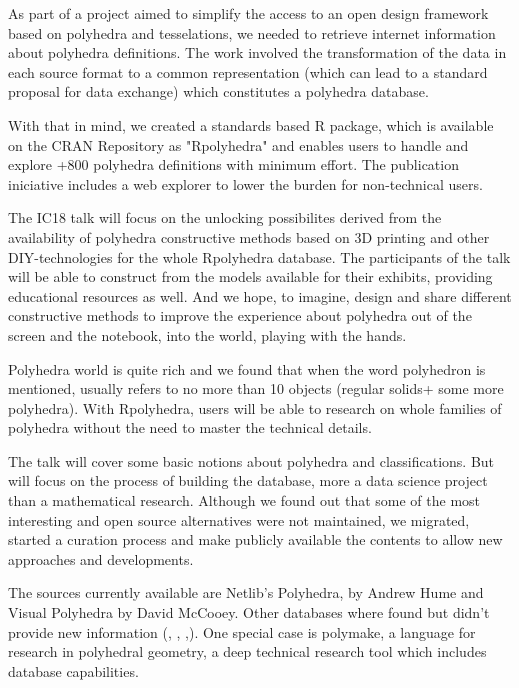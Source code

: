 \documentclass[a4paper,10pt]{article}
\begin{document}
As part of a project aimed to simplify the access to an open design framework based on polyhedra and tesselations, we needed to retrieve internet information about polyhedra definitions. The work involved the transformation of the data in each source format to a common representation (which can lead to a standard proposal for data exchange) which constitutes a polyhedra database.  

With that in mind, we created a standards based R package, which is available on the CRAN Repository as "Rpolyhedra" and enables users to handle and explore +800 polyhedra definitions with minimum effort. The publication iniciative includes a web explorer \cite{RPOLY_EXPLORER} to lower the burden for non-technical users.


The IC18 talk will focus on the unlocking possibilites derived from the availability of polyhedra constructive methods based on 3D printing and other DIY-technologies for the whole Rpolyhedra database. The participants of the talk will be able to construct from the models available for their exhibits, providing educational resources as well. And we hope, to imagine, design and share different constructive methods to improve the experience about polyhedra out of the screen and the notebook, into the world, playing with the hands.

Polyhedra world is quite rich and we found that when the word polyhedron is mentioned, usually refers to no more than 10 objects (regular solids+ some more polyhedra). With Rpolyhedra, users will be able to research on whole families of polyhedra without the need to master the technical details.

The talk will cover some basic notions about polyhedra and classifications. But will focus on the process of building the database, more a data science project than a mathematical research. Although we found out that some of the most interesting and open source alternatives were not maintained, we migrated, started a curation process and make publicly available the contents to allow new approaches and developments.

The sources currently available are Netlib's Polyhedra\cite{NETLIB}, by Andrew Hume and Visual Polyhedra\cite{DMCCOOEY} by David McCooey. Other databases where found but didn't provide new information (\cite{NAT_ALISON}, \cite{GEORGE_HART}, \cite{WOLFRAM_ALPHA_TETRA},\cite{WIKIPEDIA_TETRA}). One special case is polymake\cite{POLYMAKE}, a language for research in polyhedral geometry, a deep technical research tool which includes database capabilities. 
\end{document}
